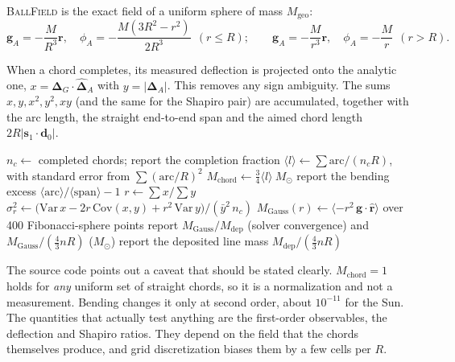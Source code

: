 \documentclass[12pt]{article}
\newcommand{\SUN}{\textcolor{sunc}{\textbf{\textsf{SUN}}}}
\newcommand{\vect}[1]{\mathbf{#1}}
\begin{document}
\noindent \textsc{BallField} is the exact field of a uniform sphere of mass $M_\text{geo}$:
\[
  \vect g_A=-\frac{M}{R^3}\vect r,\quad \phi_A=-\frac{M(3R^2-r^2)}{2R^3}\ \ (r\le R);\qquad
  \vect g_A=-\frac{M}{r^3}\vect r,\quad\phi_A=-\frac{M}{r}\ \ (r>R).
\]

When a chord completes, its measured deflection is projected onto the analytic one,
$x=\vect\Delta_G\cdot\hat{\vect\Delta}_A$ with $y=|\vect\Delta_A|$. This removes any
sign ambiguity. The sums $x,y,x^2,y^2,xy$ (and the same for the Shapiro pair) are
accumulated, together with the arc length, the straight end-to-end span and the
aimed chord length $2R|\vect s_1\cdot\vect d_0|$.

\begin{algorithm}[htbp]
\caption{\textsc{ComputeMass} (key \texttt{m}, \SUN\ only)}
\label{alg:mass}
\begin{algorithmic}[1]
\State $n_c\gets$ completed chords; report the completion fraction
\State $\langle l\rangle\gets\sum\text{arc}/(n_cR)$, with standard error from $\sum(\text{arc}/R)^2$
\State $M_\text{chord}\gets\tfrac34\langle l\rangle\ M_\odot$ 
\State report the bending excess $\langle\text{arc}\rangle/\langle\text{span}\rangle-1$ 
   \State $r\gets\sum x/\sum y$ 
   \State $\sigma_r^2\gets\big(\mathrm{Var}\,x-2r\,\mathrm{Cov}(x,y)+r^2\,\mathrm{Var}\,y\big)/(\bar y^2\,n_c)$ 
\EndFor
{} 
   \State $M_\text{Gauss}(r)\gets\langle -r^2\,\vect g\cdot\hat{\vect r}\rangle$ over 400 Fibonacci-sphere points
   \State report $M_\text{Gauss}/M_\text{dep}$ (solver convergence) and $M_\text{Gauss}/(\tfrac43nR)$ ($M_\odot$)
\EndFor
\State report the deposited line mass $M_\text{dep}/(\tfrac43nR)$
\end{algorithmic}
\end{algorithm}

The source code points out a caveat that should be stated clearly. $M_\text{chord}=1$
holds for \emph{any} uniform set of straight chords, so it is a normalization and not
a measurement. Bending changes it only at second order, about $10^{-11}$ for the Sun. The
quantities that actually test anything are the first-order observables, the deflection and
Shapiro ratios. They depend on the field that the chords themselves produce, and grid
discretization biases them by a few cells per $R$.
\end{document}
